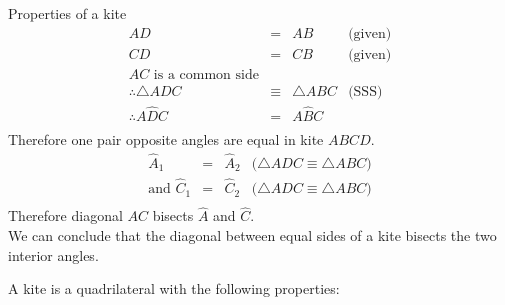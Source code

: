 \begin{wex}{Properties of a kite}
{\begin{equation*}
\begin{array}{rcll}
AD &=& AB & \mbox{(given)} \\
CD &=& CB &  \mbox{(given)} \\
AC  \mbox{ is a common side} &&&  \\
\therefore \triangle ADC &\equiv& \triangle ABC &  \mbox{(SSS)} \\
\therefore A \hat{D}C &=& A \hat{B}C & \\
\end{array}
\end{equation*}
Therefore one pair opposite angles are equal in kite $ABCD$.
\begin{equation*}
 \begin{array}{rcll}
 \hat{A}_{1} &=& \hat{A}_{2} & \mbox{($\triangle ADC \equiv \triangle ABC$)} \\ 
\mbox{and }\hat{C}_{1} &=& \hat{C}_{2} &  \mbox{($\triangle ADC \equiv \triangle ABC$)}\\ 
\end{array}
\end{equation*}
Therefore diagonal $AC$ bisects $\hat{A}$ and $\hat{C}$. \\ \newline
We can conclude that the diagonal between equal sides of a kite bisects the two interior angles.
}
\end{wex}



A kite is a quadrilateral with the following properties:

